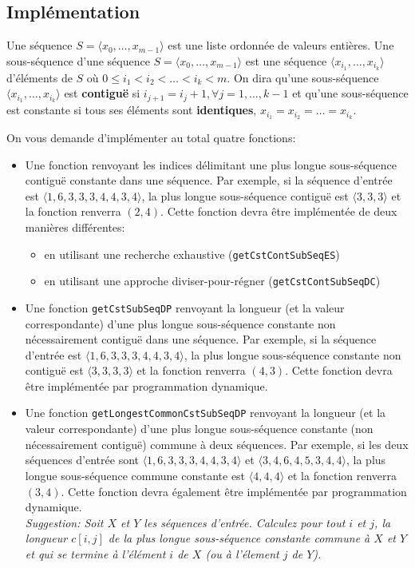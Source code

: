 \documentclass[a4paper,10pt]{article}
\begin{document}
\subsection*{Implémentation}

Une séquence $S=\langle x_0,\ldots,x_{m-1}\rangle$ est une liste
ordonnée de valeurs entières. Une sous-séquence d'une séquence
$S=\langle x_0,\ldots,x_{m-1}\rangle$ est une séquence $\langle
x_{i_1},\ldots,x_{i_k}\rangle$ d'éléments de $S$ où $0\leq i_1<i_2<\ldots<i_k<m$. On
dira qu'une sous-séquence $\langle x_{i_1},\ldots,x_{i_k}\rangle$ est
{\bf contiguë} si $i_{j+1}=i_{j}+1, \forall j=1,\ldots,k-1$ et qu'une
sous-séquence est constante si tous ses éléments sont {\bf identiques},
$x_{i_1}=x_{i_2}=\ldots=x_{i_k}$.

On vous demande d'implémenter au total quatre fonctions:

\begin{itemize}
\item Une fonction renvoyant les indices délimitant une plus longue
  sous-séquence contiguë constante dans une séquence. Par exemple, si
  la séquence d'entrée est $\langle 1,6,3,3,3,4,4,3,4\rangle$, la plus
  longue sous-séquence contiguë est $\langle 3,3,3\rangle$ et la
  fonction renverra $(2,4)$. Cette fonction devra être implémentée de
  deux manières différentes:
\begin{itemize}
\item en utilisant une recherche exhaustive (\texttt{getCstContSubSeqES})
\item en utilisant une approche diviser-pour-régner (\texttt{getCstContSubSeqDC})
\end{itemize}

\item Une fonction \texttt{getCstSubSeqDP} renvoyant la longueur (et la valeur correspondante)
  d'une plus longue sous-séquence constante non nécessairement
  contiguë dans une séquence. Par exemple, si la séquence d'entrée est
  $\langle 1,6,3,3,3,4,4,3,4\rangle$, la plus longue sous-séquence
  constante non contiguë est $\langle 3,3,3,3\rangle$ et la fonction
  renverra $(4,3)$. Cette fonction devra être implémentée par
 programmation dynamique.

\item Une fonction \texttt{getLongestCommonCstSubSeqDP} renvoyant la longueur (et la valeur correspondante)
  d'une plus longue sous-séquence constante (non nécessairement
  contiguë) commune à deux séquences. Par exemple, si les deux
  séquences d'entrée sont $\langle 1,6,3,3,3,4,4,3,4\rangle$ et
  $\langle 3,4,6,4,5,3,4,4\rangle$, la plus longue sous-séquence
  commune constante est $\langle 4,4,4 \rangle$ et la fonction
  renverra $(3,4)$. Cette fonction devra également être implémentée
  par programmation dynamique.\\

{\it Suggestion: Soit $X$ et $Y$ les séquences d'entrée. Calculez pour tout $i$ et $j$, la longueur
  $c[i,j]$ de la plus longue sous-séquence constante commune à $X$
  et $Y$ et qui se termine à l'élément $i$ de $X$ (ou à l'élement
  $j$ de $Y$).}
\end{itemize}
\end{document}
